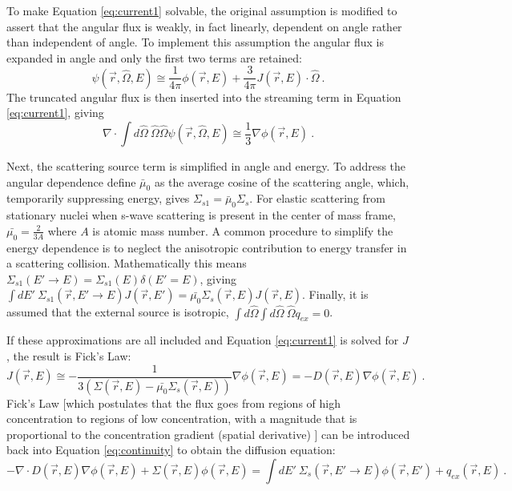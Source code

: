 \documentclass[12pt]{article}
\newlength{\up}
\newcommand{\Macro}{\ensuremath{\Sigma}}
\newcommand{\vOmega}{\ensuremath{\hat{\Omega}}}
\begin{document}
To make Equation \eqref{eq:current1} solvable, the original assumption is modified to assert that the angular flux is weakly, in fact linearly, dependent on angle rather than independent of angle. To implement this assumption the angular flux is expanded in angle and only the first two terms are retained:  
%
\begin{equation}
  \psi(\vec{r}, \vOmega, E) \cong \frac{1}{4 \pi} \phi(\vec{r}, E) + \frac{3}{4 \pi}J(\vec{r}, E) \cdot \vOmega \:.
  \label{eq:angExpand} 
\end{equation}
The truncated angular flux is then inserted into the streaming term in Equation \eqref{eq:current1}, giving 
%
\begin{equation}
  \nabla \cdot \int d \vOmega \:\vOmega \vOmega \psi(\vec{r}, \vOmega, E)  \cong \frac{1}{3} \nabla \phi(\vec{r}, E) \:. 
  \label{eq:firstTerm}
\end{equation}

Next, the scattering source term is simplified in angle and energy. To address the angular dependence define $\bar{\mu}_{0}$ as the average cosine of the scattering angle, which, temporarily suppressing energy, gives $\Macro_{s1} = \bar{\mu}_{0}\Macro_{s}$. For elastic scattering from stationary nuclei when s-wave scattering is present in the center of mass frame, $\bar{\mu_{0}} = \frac{2}{3A}$ where $A$ is atomic mass number. A common procedure to simplify the energy dependence is to neglect the anisotropic contribution to energy transfer in a scattering collision. Mathematically this means $\Macro_{s1}(E' \to E) = \Macro_{s1}(E) \delta(E' = E)$, giving $\int dE' \:\Macro_{s1}(\vec{r}, E' \to E)J(\vec{r},E') = \bar{\mu_{0}}\Macro_{s}(\vec{r},E)J(\vec{r},E)$. Finally, it is assumed that the external source is isotropic, $\int  d\vOmega \int d\vOmega \:\vOmega q_{ex} = 0$.

If these approximations are all included and Equation \eqref{eq:current1} is solved for $J$, the result is Fick's Law:
%
\begin{equation}
  J(\vec{r},E) \cong -\frac{1}{3(\Macro(\vec{r},E) - \bar{\mu_{0}}\Macro_{s}(\vec{r},E))} \nabla \phi (\vec{r},E) = -D(\vec{r},E) \nabla \phi (\vec{r},E) \:.
\end{equation}
%
Fick's Law [which postulates that the flux goes from regions of high concentration to regions of low concentration, with a magnitude that is proportional to the concentration gradient (spatial derivative) ] can be introduced back into Equation \eqref{eq:continuity} to obtain the diffusion equation:
%
\begin{equation}
  -\nabla \cdot D(\vec{r},E) \nabla \phi(\vec{r},E) + \Macro(\vec{r},E)\phi(\vec{r},E) = \int dE' \:\Macro_{s}(\vec{r}, E' \to E)\phi(\vec{r},E') + q_{ex}(\vec{r},E) \:.
  \label{eq:diffusion}
\end{equation}
\end{document}
